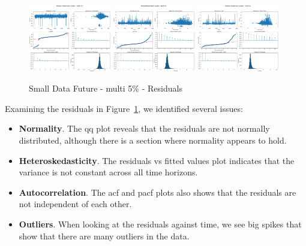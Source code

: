 \documentclass[11pt,english,a4paper,hidelinks]{book}
\begin{document}
\begin{figure}[H]
    \centering
    \includegraphics[width=0.32\textwidth]{images/code/models/linear_regression/first_model/Multi/quality_profit_1m_residuals.png}
    \includegraphics[width=0.32\textwidth]{images/code/models/linear_regression/first_model/Multi/quality_profit_1y_residuals.png}
    \includegraphics[width=0.32\textwidth]{images/code/models/linear_regression/first_model/Multi/quality_profit_5y_residuals.png}
    \caption{Small Data Future - \acrshort{multi} 5\% - Residuals}
    \label{fig:first_linear_regression_residuals}
\end{figure}

\vspace{0.5cm}
\noindent Examining the residuals in Figure~\ref{fig:first_linear_regression_residuals}, we identified several issues:

\begin{itemize}
    \item \textbf{Normality}. The \acrshort{qq} plot reveals that the residuals are not normally distributed, although there is a section where normality appears to hold.
    \item \textbf{Heteroskedasticity}. The residuals vs fitted values plot indicates that the variance is not constant across all time horizons.
    \item \textbf{Autocorrelation}. The \acrshort{acf} and \acrshort{pacf} plots also shows that the residuals are not independent of each other.
    \item \textbf{Outliers}. When looking at the residuals against time, we see big spikes that show that there are many outliers in the data.
\end{itemize}
\end{document}
